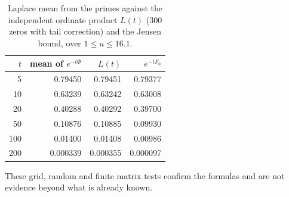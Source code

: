 \begin{table}[h]\centering\small
\begin{tabular}{rrrr}
\toprule
$t$ & mean of $e^{-t\Phi}$ & $L(t)$ & $e^{-tF_0}$\\
\midrule
5 & 0.79450 & 0.79451 & 0.79377\\
10 & 0.63239 & 0.63242 & 0.63008\\
20 & 0.40288 & 0.40292 & 0.39700\\
50 & 0.10876 & 0.10885 & 0.09930\\
100 & 0.01400 & 0.01408 & 0.00986\\
200 & 0.000339 & 0.000355 & 0.000097\\
\bottomrule
\end{tabular}
\caption{Laplace mean from the primes against the independent ordinate product $L(t)$ (300 zeros with tail correction) and the Jensen bound, over $1\le u\le16.1$.}\label{st:tab:mean}
\end{table}
These grid, random and finite matrix tests confirm the formulas and are not evidence beyond what is already known.

